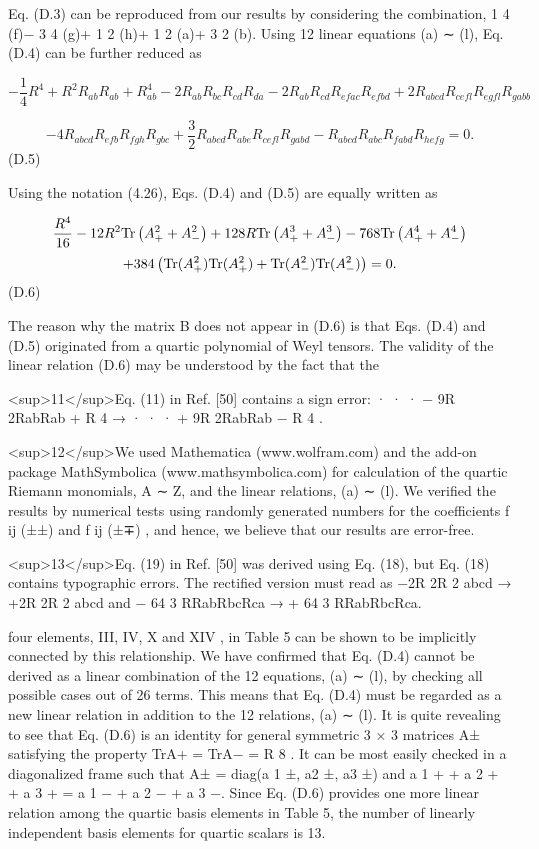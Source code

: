 \documentclass{article}
\begin{document}
Eq. (D.3) can be reproduced from our results by considering the combination, 1 4 (f)− 3 4 (g)+ 1 2 (h)+ 1 2 (a)+ 3 2 (b). Using 12 linear equations (a) ∼ (l), Eq. (D.4) can be further reduced as

$$-\frac{1}{4}R^{4}+R^{2}R_{ab}R_{ab}+R^{4}_{ab}-2R_{ab}R_{bc}R_{cd}R_{da}-2R_{ab}R_{cd}R_{efac}R_{efbd}+2R_{abcd}R_{cefl}R_{egfl}R_{gabb}$$

$$-4R_{abcd}R_{efb}R_{fgh}R_{gbc}+\frac{3}{2}R_{abcd}R_{abe}R_{cefl}R_{gabd}-R_{abcd}R_{abc}R_{fabd}R_{hefg}=0.$$ (D.5)

Using the notation (4.26), Eqs. (D.4) and (D.5) are equally written as

$$\frac{R^{4}}{16}-12R^{2}{\rm Tr}\left(A_{+}^{2}+A_{-}^{2}\right)+128R{\rm Tr}\left(A_{+}^{3}+A_{-}^{3}\right)-768{\rm Tr}\left(A_{+}^{4}+A_{-}^{4}\right)$$ $$+384\left({\rm Tr}(A_{+}^{2}){\rm Tr}(A_{+}^{2})+{\rm Tr}(A_{-}^{2}){\rm Tr}(A_{-}^{2})\right)=0.$$ (D.6)

The reason why the matrix B does not appear in (D.6) is that Eqs. (D.4) and (D.5) originated from a quartic polynomial of Weyl tensors. The validity of the linear relation (D.6) may be understood by the fact that the

<sup>11</sup>Eq. (11) in Ref. [50] contains a sign error: · · · − 9R 2RabRab + R 4 → · · · + 9R 2RabRab − R 4 .

<sup>12</sup>We used Mathematica (www.wolfram.com) and the add-on package MathSymbolica (www.mathsymbolica.com) for calculation of the quartic Riemann monomials, A ∼ Z, and the linear relations, (a) ∼ (l). We verified the results by numerical tests using randomly generated numbers for the coefficients f ij (±±) and f ij (±∓) , and hence, we believe that our results are error-free.

<sup>13</sup>Eq. (19) in Ref. [50] was derived using Eq. (18), but Eq. (18) contains typographic errors. The rectified version must read as −2R 2R 2 abcd → +2R 2R 2 abcd and − 64 3 RRabRbcRca → + 64 3 RRabRbcRca.

four elements, III, IV, X and XIV , in Table 5 can be shown to be implicitly connected by this relationship. We have confirmed that Eq. (D.4) cannot be derived as a linear combination of the 12 equations, (a) ∼ (l), by checking all possible cases out of 26 terms. This means that Eq. (D.4) must be regarded as a new linear relation in addition to the 12 relations, (a) ∼ (l). It is quite revealing to see that Eq. (D.6) is an identity for general symmetric 3 × 3 matrices A± satisfying the property TrA+ = TrA− = R 8 . It can be most easily checked in a diagonalized frame such that A± = diag(a 1 ±, a2 ±, a3 ±) and a 1 + + a 2 + + a 3 + = a 1 − + a 2 − + a 3 −. Since Eq. (D.6) provides one more linear relation among the quartic basis elements in Table 5, the number of linearly independent basis elements for quartic scalars is 13.
\end{document}
